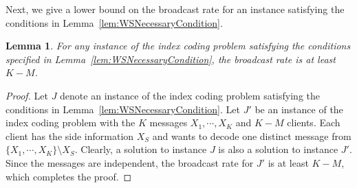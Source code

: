 \documentclass[letterpaper, 10 pt, conference]{ieeeconf}
\newtheorem{lemma}{Lemma}
\begin{document}

Next, we give a lower bound on the broadcast rate for an instance satisfying the conditions in Lemma~\ref{lem:WSNecessaryCondition}.

\begin{lemma}
\label{lem:WSTransmissionBound}
For any instance of the index coding problem satisfying the conditions specified in Lemma~\ref{lem:WSNecessaryCondition}, the broadcast rate is at least $K - M$.
\end{lemma}

\begin{proof}
Let $J$ denote an instance of the index coding problem satisfying the conditions in Lemma~\ref{lem:WSNecessaryCondition}. Let $J'$ be an instance of the index coding problem with the $K$ messages $X_1,\cdots,X_K$ and $K-M$ clients. Each client has the side information $X_S$ and wants to decode one distinct message from $\{X_1,\cdots,X_K\}\setminus X_S$. Clearly, a solution to instance $J$ is also a solution to instance $J'$. Since the messages are independent, the broadcast rate for $J'$ is at least $K-M$, which completes the proof. 
\end{proof}


\end{document}
